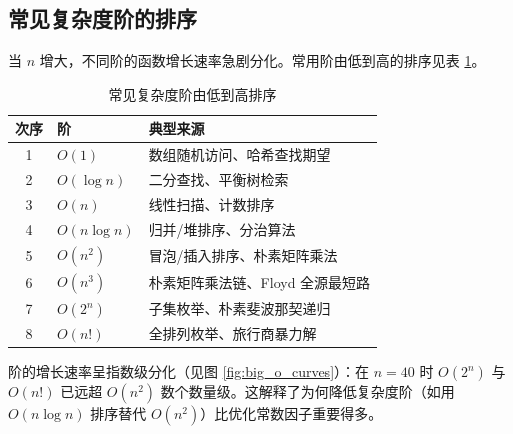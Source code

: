 \subsection{常见复杂度阶的排序}

当 $n$ 增大，不同阶的函数增长速率急剧分化。常用阶由低到高的排序见表 \ref{tab:order}。

\begin{table}[H]
\centering
\caption{常见复杂度阶由低到高排序}
\label{tab:order}
\begin{tabularx}{\textwidth}{c l X}
\toprule
次序 & 阶 & 典型来源 \\
\midrule
1 & $O(1)$ & 数组随机访问、哈希查找期望 \\
2 & $O(\log n)$ & 二分查找、平衡树检索 \\
3 & $O(n)$ & 线性扫描、计数排序 \\
4 & $O(n\log n)$ & 归并/堆排序、分治算法 \\
5 & $O(n^2)$ & 冒泡/插入排序、朴素矩阵乘法 \\
6 & $O(n^3)$ & 朴素矩阵乘法链、Floyd 全源最短路 \\
7 & $O(2^n)$ & 子集枚举、朴素斐波那契递归 \\
8 & $O(n!)$ & 全排列枚举、旅行商暴力解 \\
\bottomrule
\end{tabularx}
\end{table}

阶的增长速率呈指数级分化（见图 \ref{fig:big_o_curves}）：在 $n=40$ 时 $O(2^n)$ 与 $O(n!)$ 已远超 $O(n^2)$ 数个数量级。这解释了为何降低复杂度阶（如用 $O(n\log n)$ 排序替代 $O(n^2)$）比优化常数因子重要得多。

